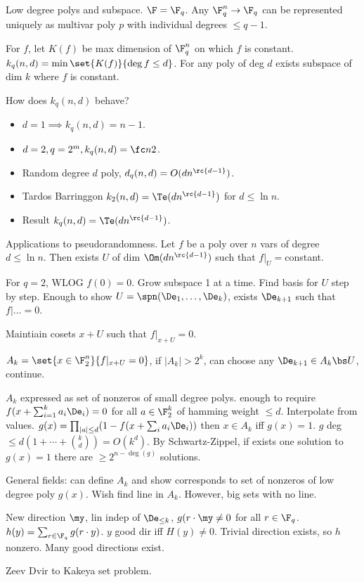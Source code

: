 Low degree polys and subspace. $\F=\F_q$. Any $\F_q^n\to \F_q$ can be represented uniquely as multivar poly $p$ with individual degrees $\le q-1$. 

For $f$, let $K(f)$ be max dimension of $\F_q^n$ on which $f$ is constant. $k_q(n,d)=\min\set{K(f)}{\deg f\le d}$. For any poly of deg $d$ exists subspace of dim $k$ where $f$ is constant.

How does $k_q(n,d)$ behave? 
\begin{itemize}
\item
$d=1\implies k_q(n,d)=n-1$.
\item
$d=2,q=2^m, k_q(n,d)=\fc n2$.
\item
Random degree $d$ poly, $d_q(n,d)=O(dn^{\rc{d-1}})$. 
\item
Tardos Barringgon $k_2(n,d)=\Te(dn^{\rc{d-1}})$ for $d\le \ln n$.
\item
Result $k_q(n,d)=\Te(dn^{\rc{d-1}})$. 
\end{itemize}
Applications to pseudorandomness.
Let $f$ be a poly over $n$ vars of degree $d\le \ln n$. Then exists $U$ of dim $\Om(dn^{\rc{d-1}})$ such that $f|_U=$constant.

For $q=2$, WLOG $f(0)=0$. Grow subspace 1 at a time. Find basis for $U$ step by step. Enough to show $U=\spn(\De_1,\ldots, \De_k)$, exists $\De_{k+1}$ such that $f|...=0$.

Maintiain cosets $x+U$ such that $f|_{x+U}=0$.

$A_k=\set{x\in \F_2^n}{f|_{x+U}=0}$, if $|A_k|>2^k$, can choose any $\De_{k+1}\in A_k\bs U$, continue.

$A_k$ expressed as set of nonzeros of small degree polys. enough to require $f(x+\sum_{i=1}^k a_i\De_i)=0$ for all $a\in \F_2^k$ of hamming weight $\le d$. Interpolate from values. $g(x)=\prod_{|a|\le d}(1-f(x+\sum_i a_i\De_i))$ then $x\in A_k$ iff $g(x)=1$.
$g$ deg$\le d(1+\cdots +\binom kd)=O(k^d)$. 
By Schwartz-Zippel, if exists one solution to $g(x)=1$ there are $\ge 2^{n-\deg(g)}$ solutions.

General fields: can define $A_k$ and show corresponds to set of nonzeros of low degree poly $g(x)$. Wish find line in $A_k$. However, big sets with no line.

New direction $\my$, lin indep of $\De_{\le k}$, $g(r\cdot \my\ne 0$ for all $r\in \F_q$. $h(y)=\sum_{r\in \F_q} g(r\cdot y)$. $y$ good dir iff $H(y)\ne 0$. Trivial direction exists, so $h$ nonzero. Many good directions exist.

Zeev Dvir to Kakeya set problem.

